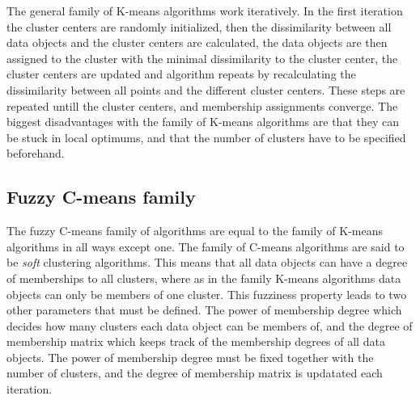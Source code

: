 The general family of K-means algorithms work iteratively. In the first iteration the cluster centers are randomly initialized, 
then the dissimilarity between all data objects and the cluster centers are calculated, 
the data objects are then assigned to the cluster with the minimal dissimilarity to the cluster center,
the cluster centers are updated and algorithm repeats by recalculating the dissimilarity between all points and the different cluster centers.
These steps are repeated untill the cluster centers, and membership assignments converge.
The biggest disadvantages with the family of K-means algorithms are that they can be stuck in local optimums, 
and that the number of clusters have to be specified beforehand.

\subsection{Fuzzy C-means family}
The fuzzy C-means family of algorithms are equal to the family of K-means algorithms in all ways except one. 
The family of C-means algorithms are said to be \textit{soft} clustering algorithms. 
This means that all data objects can have a degree of memberships to all clusters, where as in the family K-means algorithms data objects can only be members of one cluster.
This fuzziness property leads to two other parameters that must be defined.
The power of membership degree which decides how many clusters each data object can be members of, 
and the degree of membership matrix which keeps track of the membership degrees of all data objects.
The power of membership degree must be fixed together with the number of clusters, and the degree of membership matrix is updatated each iteration.

